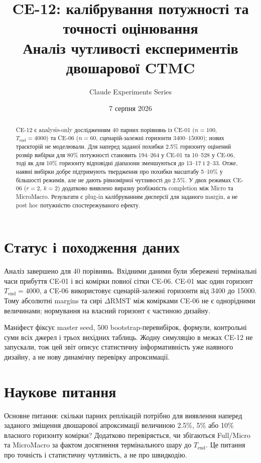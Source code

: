 \documentclass[11pt,a4paper]{article}
\title{\textbf{CE-12: калібрування потужності та точності оцінювання}\\[0.4em]
\large Аналіз чутливості експериментів двошарової CTMC}
\author{Claude Experiments Series}
\date{7 серпня 2026}
\begin{document}
\sloppy
\maketitle

\begin{abstract}
CE-12 є analysis-only дослідженням 40 парних порівнянь із CE-01
($n=100$, $T_{\mathrm{end}}=4000$) та CE-06 ($n=60$, сценарій-залежні
горизонти $3400$--$15000$); нових траєкторій не моделювали.
Для наперед заданої похибки 2.5\% горизонту оцінений розмір вибірки для
80\% потужності становить 194--264 у CE-01 та 10--528 у CE-06, тоді як
для 10\% горизонту відповідні діапазони зменшуються до 13--17 і 2--33.
Отже, наявні вибірки добре підтримують твердження про похибки масштабу
5--10\% у більшості режимів, але не дають рівномірної чутливості до 2.5\%.
У двох режимах CE-06 ($r=2$, $k=2$) додатково виявлено виразну розбіжність
completion між Micro та MicroMacro. Результати є plug-in калібруванням
дисперсії для заданого margin, а не post hoc потужністю спостережуваного ефекту.
\end{abstract}

\tableofcontents
\clearpage

\section{Статус і походження даних}\label{sec:status}

Аналіз завершено для 40 порівнянь. Вхідними даними були збережені термінальні
часи прибуття CE-01 і всі комірки повної сітки CE-06. CE-01 має один горизонт
$T_{\mathrm{end}}=4000$, а CE-06 використовує сценарій-залежні горизонти від
3400 до 15000. Тому абсолютні margins та сирі $\Delta\mathrm{RMST}$ між
комірками CE-06 не є однорідними величинами; нормування на власний горизонт
є частиною дизайну.

Маніфест фіксує master seed, 500 bootstrap-перевибірок, формули, контрольні
суми всіх джерел і трьох вихідних таблиць. Жодну симуляцію в межах CE-12 не
запускали, тож цей звіт описує статистичну інформативність уже наявного дизайну,
а не нову динамічну перевірку апроксимації.

\section{Наукове питання}\label{sec:question}

Основне питання: скільки парних реплікацій потрібно для виявлення наперед
заданого зміщення двошарової апроксимації величиною 2.5\%, 5\% або 10\%
власного горизонту комірки? Додатково перевіряється, чи збігаються Full/Micro
та MicroMacro за фактом досягнення термінального шару до $T_{\mathrm{end}}$.
Це питання про точність і статистичну чутливість, а не про швидкодію.
\end{document}

